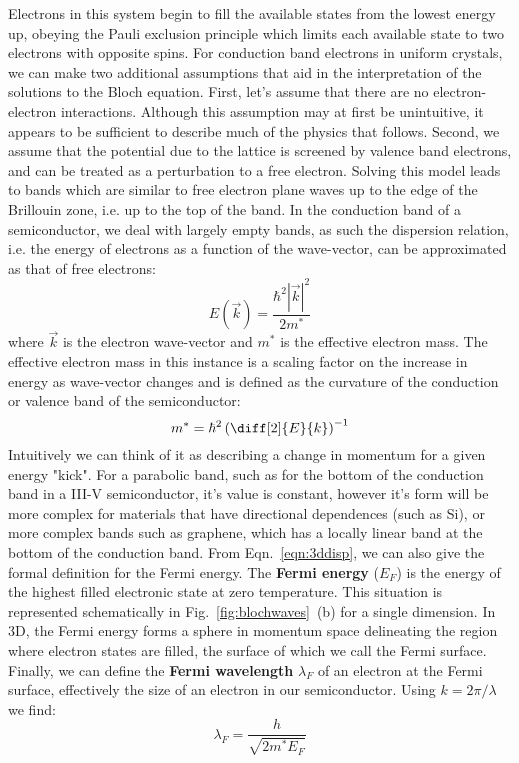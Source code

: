 Electrons in this system begin to fill the available states from the lowest energy up, obeying the Pauli exclusion principle which limits
each available state to two electrons with opposite spins. For conduction band electrons in uniform crystals, we can make
two additional assumptions that aid in the interpretation of the solutions to the Bloch equation. First, let's assume that
there are no electron-electron interactions. Although this assumption may at first be unintuitive, it appears
to be sufficient to describe much of the physics that follows. Second, we assume that the potential due to the
lattice is screened by valence band electrons, and can be treated as a perturbation to a free electron. Solving
this model leads to bands which are similar to free electron plane waves up to the edge of the Brillouin zone, i.e.
up to the top of the band. In the conduction band of a semiconductor, we deal with largely empty bands, as such
the dispersion relation, i.e. the energy of electrons as a function of the wave-vector, can be approximated as that of free electrons:
\begin{equation}
  E(\vec{k}) = \frac{\hbar^2 |\vec{k}|^2}{2m^*}
  \label{eqn:3ddisp}
\end{equation}
where $\vec{k}$ is the electron wave-vector and $m^*$ is the effective electron mass. The effective electron mass in this
instance is a scaling factor on the increase in energy as wave-vector changes and is defined as the curvature of the conduction
or valence band of the semiconductor:
\begin{equation}
  m^* = \hbar^2 \left(\diff[2]{E}{k}\right)^{-1}
\end{equation}
Intuitively we can think of it as describing a change in momentum for a given energy "kick". For a parabolic
band, such as for the bottom of the conduction band in a III-V semiconductor, it's value is constant, however
it's form will be more complex for materials that have directional dependences (such as Si), or more complex bands
such as graphene, which has a locally linear band at the bottom of the conduction band. From Eqn.~\ref{eqn:3ddisp}, we can also give the
formal definition for the Fermi energy. The \textbf{Fermi energy} ($E_F$) is the energy of the highest filled electronic state
at zero temperature. This situation is represented schematically in Fig.~\ref{fig:blochwaves}~(b) for a single dimension.
In 3D, the Fermi energy forms a sphere in momentum space delineating the region where electron states are filled, the surface
of which we call the Fermi surface. Finally, we can define the \textbf{Fermi wavelength} $\lambda_F$ of an electron at the Fermi
surface, effectively the size of an electron in our semiconductor. Using $k = 2\pi/\lambda$ we find:
\begin{equation}
  \lambda_F = \frac{h}{\sqrt{2m^*E_F}}
\end{equation}

